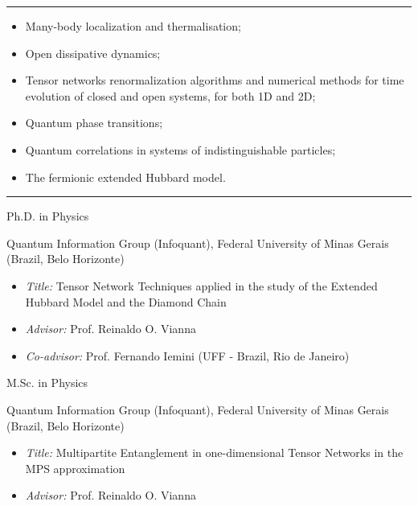 \documentclass[a4paper,10pt]{article}
\newlength{\cvcolumngapwidth}
\newlength{\cvleftcolumnwidth}
\newlength{\cvrightcolumnwidth}
\newcommand{\cvsectionstyle}[1]{{\normalsize\cvsectionfont\textcolor{cvsectioncolor}{#1}}}
\newcommand{\cvtitlestyle}[1]{{\normalsize\cvtitlefont\textcolor{cvtitlecolor}{#1}}}
\newcommand{\cvdurationstyle}[1]{{\normalsize\cvdurationfont\textcolor{cvdurationcolor}{#1}}}
\newlength{\cvafteritemskipamount}
\newlength{\cvaftersectionskipamount}
\newlength{\cvaftertitleskipamount}
\newlength{\cvparskip}
\newcommand{\cvsection}[1]{
    \begin{minipage}[t]{\cvleftcolumnwidth}
        \raggedleft\cvsectionstyle{#1}
    \end{minipage}%
    \hspace{\cvcolumngapwidth}%
    \begin{minipage}[t]{\cvrightcolumnwidth}
        \textcolor{cvrulecolor}{\rule{\cvrightcolumnwidth}{0.5mm}}
    \end{minipage}
    \vspace{\cvaftersectionskipamount}}
\newcommand{\cvitem}[2]{
    \begin{minipage}[t]{\cvleftcolumnwidth}
        \raggedleft #1
    \end{minipage}%
    \hspace{\cvcolumngapwidth}%
    \begin{minipage}[t]{\cvrightcolumnwidth}
        \setlength{\parskip}{\cvparskip} #2
    \end{minipage}
    \vspace{\cvafteritemskipamount}}
\newcommand{\cvtitle}[1]{
    \cvtitlestyle{#1}
    \vspace{\cvaftertitleskipamount}
    \vspace{-\cvparskip}}
\begin{document}
\cvsection{Topics of Interest}

\cvitem{\cvdurationstyle{}}
    {\cvtitle{}
    \begin{itemize}[leftmargin=*]
    \item Many-body localization and thermalisation;
    \item Open dissipative dynamics;
    \item Tensor networks renormalization algorithms and numerical methods for time evolution of closed and open systems, for both 1D and 2D;
    \item Quantum phase transitions;
    \item Quantum correlations in systems of indistinguishable particles;
    \item The fermionic extended Hubbard model.
    \end{itemize}}

\cvsection{Education}

\cvitem{\cvdurationstyle{2016 - Present}}
    {\cvtitle{Ph.D. in Physics}

    Quantum Information Group (Infoquant), Federal University of Minas Gerais (Brazil, Belo Horizonte)
    
        \begin{itemize}[leftmargin=*]
        \item \textit{Title:} Tensor Network Techniques applied in the study 
        of the Extended Hubbard Model and the Diamond Chain
        
        \item \textit{Advisor:} Prof. Reinaldo O. Vianna
        
        \item \textit{Co-advisor:} Prof. Fernando Iemini (UFF - Brazil, Rio de Janeiro)
        \end{itemize}}

\cvitem{\cvdurationstyle{2014 - 2016}}
    {\cvtitle{M.Sc. in Physics}

    Quantum Information Group (Infoquant), Federal University of Minas Gerais (Brazil, Belo Horizonte)
    
    \begin{itemize}[leftmargin=*]
        \item \textit{Title:} Multipartite Entanglement in one-dimensional Tensor Networks in the MPS approximation
        
        \item \textit{Advisor:} Prof. Reinaldo O. Vianna
        
        \end{itemize}}
\end{document}
